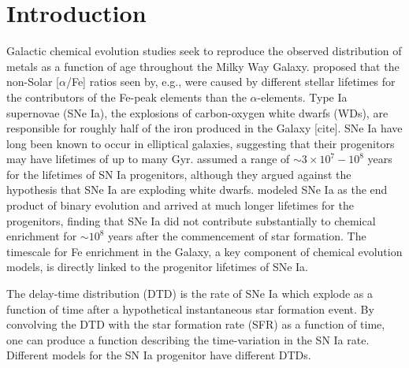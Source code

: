 \documentclass[modern,linenumbers]{aastex631}
\newcommand{\aFe}{[$\alpha$/Fe]\xspace}
\begin{document}
\section{Introduction}

Galactic chemical evolution studies seek to reproduce the observed distribution of metals as a function of age throughout the Milky Way Galaxy. \citet{Tinsley1979-StellarLifetimes} proposed that the non-Solar \aFe ratios seen by, e.g., \citet{Wallerstein1962-GDwarfAbundances} were caused by different stellar lifetimes for the contributors of the Fe-peak elements than the $\alpha$-elements. Type Ia supernovae (SNe Ia), the explosions of carbon-oxygen white dwarfs (WDs), are responsible for roughly half of the iron produced in the Galaxy [cite]. SNe Ia have long been known to occur in elliptical galaxies, suggesting that their progenitors may have lifetimes of up to many Gyr. \citet{Tinsley1979-StellarLifetimes} assumed a range of $\sim 3\times 10^7 - 10^8$ years for the lifetimes of SN Ia progenitors, although they argued against the hypothesis that SNe Ia are exploding white dwarfs. \citet{Matteucci1986-SupernovaEnrichment} modeled SNe Ia as the end product of binary evolution and arrived at much longer lifetimes for the progenitors, finding that SNe Ia did not contribute substantially to chemical enrichment for $\sim 10^8$ years after the commencement of star formation. 
The timescale for Fe enrichment in the Galaxy, a key component of chemical evolution models, is directly linked to the progenitor lifetimes of SNe Ia.

The delay-time distribution (DTD) is the rate of SNe Ia which explode as a function of time after a hypothetical instantaneous star formation event. By convolving the DTD with the star formation rate (SFR) as a function of time, one can produce a function describing the time-variation in the SN Ia rate.
Different models for the SN Ia progenitor have different DTDs.
\end{document}
